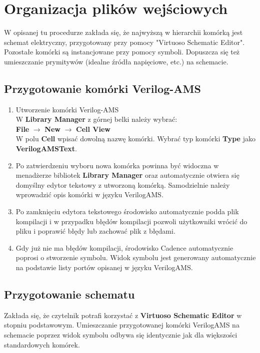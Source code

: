 \documentclass[10pt,a4paper,twoside]{report}
\theoremstyle{definition}
\theoremstyle{definition}
\theoremstyle{definition}
\theoremstyle{definition}
\theoremstyle{definition}
\begin{document}
{{{{{	\section{Organizacja plików wejściowych}
	{	W opisanej tu procedurze zakłada się, że najwyższą w hierarchii komórką jest schemat elektryczny, przygotowany przy pomocy "Virtuoso Schematic Editor". Pozostałe komórki są instancjowane przy pomocy symboli. Dopuszcza się też umieszczanie prymitywów (idealne źródła napięciowe, etc.) na schemacie.}
	\subsection{Przygotowanie komórki Verilog-AMS}
	\begin{enumerate}
		\item Utworzenie komórki Verilog-AMS \\
			W \textbf{Library Manager} z górnej belki należy wybrać: \\ 
			\textbf{File} $\rightarrow$ \textbf{New} $\rightarrow$ \textbf{Cell View} \\
			\subitem W polu \textbf{Cell} wpisać dowolną nazwę komórki.
			\subitem Wybrać typ komórki \textbf{Type} jako \textbf{VerilogAMSText}.
		\item Po zatwierdzeniu wyboru nowa komórka powinna być widoczna w menadżerze bibliotek \textbf{Library Manager} oraz automatycznie otwiera się domyślny edytor tekstowy z utworzoną komórką. Samodzielnie należy wprowadzić opis komórki w języku VerilogAMS.
		\item Po zamknięciu edytora tekstowego środowisko automatycznie podda plik kompilacji i w przypadku błędów kompilacji pozwoli użytkowniki wrócić do pliku i poprawić błędy lub zachować plik z błędami.
		\item Gdy już nie ma błędów kompilacji, środowisko Cadence automatycznie poprosi o stworzenie symbolu. Widok symbolu jest generowany automatycznie na podstawie listy portów opisanej w języku VerilogAMS.
	\end{enumerate}
	\subsection{Przygotowanie schematu}
	{	Zakłada się, że czytelnik potrafi korzystać z \textbf{Virtuoso Schematic Editor} w stopniu podstawowym. Umieszczanie przygotowanej komórki VerilogAMS na schemacie poprzez widok symbolu odbywa się identycznie jak dla większości standardowych komórek.}
}}}}}
\end{document}
